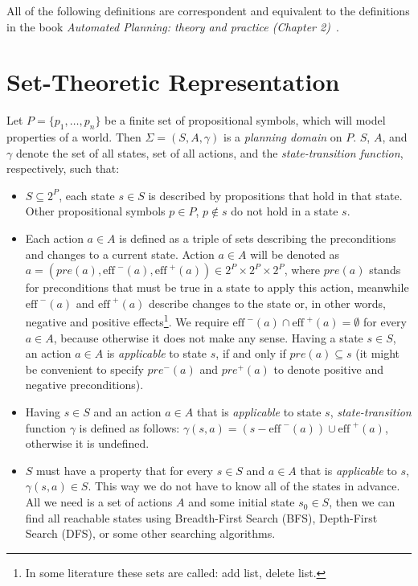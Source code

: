 \medskip\noindent
All of the following definitions are correspondent and equivalent to the definitions in the book \emph{Automated Planning: theory and practice (Chapter 2)}~\cite{nau}.

\section{Set-Theoretic Representation}

\begin{defn}\label{def01:1}
  Let $P = \{p_1,\dots,p_n\}$ be a finite set of propositional symbols, which will model properties of a world. Then $\Sigma = (S, A, \gamma)$ is a \emph{planning domain} on $P$. $S$, $A$, and $\gamma$ denote the set of all states, set of all actions, and the \emph{state-transition function}, respectively, such that:

  \begin{itemize}
      \item $S \subseteq 2^{P}$, each state $s \in S$ is described by propositions that hold in that state. Other propositional symbols $p \in P$, $p \notin s$ do not hold in a state $s$.
      
      \item Each action $a \in A$ is defined as a triple of sets describing the preconditions and changes to a current state. Action $a \in A$ will be denoted as \mbox{$a=(pre(a), \text{eff}^{\,\,-}(a), \text{eff}^{\,\,+}(a)) \in  2^{P} \times 2^{P} \times 2^{P}$}, where $pre(a)$ stands for preconditions that must be true in a state to apply this action, meanwhile $\text{eff}^{\,\,-}(a)$ and $\text{eff}^{\,\,+}(a)$ describe changes to the state or, in other words, negative and positive effects\footnote{In some literature these sets are called: add list, delete list.}. We require $\text{eff}^{\,\,-}(a) \cap \text{eff}^{\,\,+}(a) = \emptyset$ for every $a \in A$, because otherwise it does not make any sense. Having a state $s \in S$, an action $a \in A$ is \emph{applicable} to state $s$, if and only if $pre(a) \subseteq s$ (it might be convenient to specify $pre^{-}(a)$ and $pre^{+}(a)$ to denote positive and negative preconditions).
      
      \item Having $s \in S$ and an action $a \in A$ that is \emph{applicable} to state $s$, \emph{state-transition} function $\gamma$ is defined as follows: $\gamma(s,a)=(s-\text{eff}^{\,\,-}(a)) \cup \text{eff}^{\,\,+}(a)$, otherwise it is undefined.
      \item $S$ must have a property that for every $s \in S$ and $a \in A$ that is \emph{applicable} to $s$, $\gamma(s,a) \in S$. This way we do not have to know all of the states in advance. All we need is a set of actions $A$ and some initial state $s_0 \in S$, then we can find all reachable states using Breadth-First Search (BFS), Depth-First Search (DFS), or some other searching algorithms.
  \end{itemize}
\end{defn}

